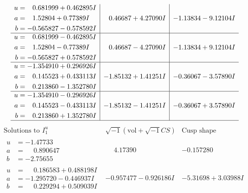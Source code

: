\documentclass[1p]{elsarticle_modified}
\theoremstyle{definition}
\newcommand{\I}{\sqrt{-1}}
\begin{document}
$$\begin{array}{c|c|c}
\begin{aligned}
u &= \phantom{-}0.681999 + 0.462895 I \\
a &= \phantom{-}1.52804 + 0.77389 I \\
b &= -0.565827 - 0.578592 I\end{aligned}
 & \phantom{-}0.46687 + 4.27090 I & -1.13834 - 9.12104 I \\ \hline\begin{aligned}
u &= \phantom{-}0.681999 - 0.462895 I \\
a &= \phantom{-}1.52804 - 0.77389 I \\
b &= -0.565827 + 0.578592 I\end{aligned}
 & \phantom{-}0.46687 - 4.27090 I & -1.13834 + 9.12104 I \\ \hline\begin{aligned}
u &= -1.354910 + 0.296926 I \\
a &= \phantom{-}0.145523 + 0.433113 I \\
b &= \phantom{-}0.213860 - 1.352780 I\end{aligned}
 & -1.85132 + 1.41251 I & -0.36067 - 3.57890 I \\ \hline\begin{aligned}
u &= -1.354910 - 0.296926 I \\
a &= \phantom{-}0.145523 - 0.433113 I \\
b &= \phantom{-}0.213860 + 1.352780 I\end{aligned}
 & -1.85132 - 1.41251 I & -0.36067 + 3.57890 I\\
 \hline 
 \end{array}$$\newpage$$\begin{array}{c|c|c}  
\text{Solutions to }I^u_{1}& \I (\text{vol} + \sqrt{-1}CS) & \text{Cusp shape}\\
 \hline 
\begin{aligned}
u &= -1.47733\phantom{ +0.000000I} \\
a &= \phantom{-}0.890647\phantom{ +0.000000I} \\
b &= -2.75655\phantom{ +0.000000I}\end{aligned}
 & \phantom{-}4.17390\phantom{ +0.000000I} & -0.157280\phantom{ +0.000000I} \\ \hline\begin{aligned}
u &= \phantom{-}0.186583 + 0.488198 I \\
a &= -1.295720 - 0.446937 I \\
b &= \phantom{-}0.229294 + 0.509039 I\end{aligned}
 & -0.957477 - 0.926186 I & -5.31698 + 3.03988 I \\ \hline\begin{aligned}

\end{aligned}
\end{array}$$
\end{document}
